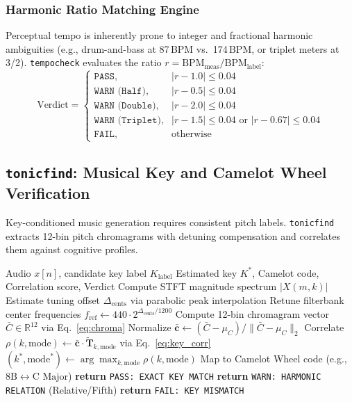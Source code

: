 \documentclass[10pt,journal,compsoc]{IEEEtran}
\begin{document}
\subsubsection{Harmonic Ratio Matching Engine}
Perceptual tempo is inherently prone to integer and fractional harmonic ambiguities (e.g., drum-and-bass at 87\,BPM vs.\ 174\,BPM, or triplet meters at 3/2). \texttt{tempocheck} evaluates the ratio $r = \text{BPM}_{\text{meas}} / \text{BPM}_{\text{label}}$:
\begin{equation}
\text{Verdict} = 
\begin{cases}
\texttt{PASS}, & |r - 1.0| \le 0.04 \\
\texttt{WARN (Half)}, & |r - 0.5| \le 0.04 \\
\texttt{WARN (Double)}, & |r - 2.0| \le 0.04 \\
\texttt{WARN (Triplet)}, & |r - 1.5| \le 0.04 \text{ or } |r - 0.67| \le 0.04 \\
\texttt{FAIL}, & \text{otherwise}
\end{cases}
\label{eq:tempo_verdict}
\end{equation}

\subsection{\texttt{tonicfind}: Musical Key and Camelot Wheel Verification}
Key-conditioned music generation requires consistent pitch labels. \texttt{tonicfind} extracts 12-bin pitch chromagrams with detuning compensation and correlates them against cognitive profiles.

\begin{algorithm}[t]
\caption{\texttt{tonicfind}: Detuning-Corrected Key Identification}
\label{alg:tonicfind}
\begin{algorithmic}[1]
\REQUIRE Audio $x[n]$, candidate key label $K_{\text{label}}$
\ENSURE Estimated key $K^*$, Camelot code, Correlation score, Verdict
\STATE Compute STFT magnitude spectrum $|X(m, k)|$
\STATE Estimate tuning offset $\Delta_{\text{cents}}$ via parabolic peak interpolation
\STATE Retune filterbank center frequencies $f_{\text{ref}} \leftarrow 440 \cdot 2^{\Delta_{\text{cents}}/1200}$
\STATE Compute 12-bin chromagram vector $\bar{C} \in \mathbb{R}^{12}$ via Eq.~\eqref{eq:chroma}
\STATE Normalize $\bar{\mathbf{c}} \leftarrow (\bar{C} - \mu_C) / \|\bar{C} - \mu_C\|_2$
    \STATE Correlate $\rho(k, \text{mode}) \leftarrow \bar{\mathbf{c}} \cdot \tilde{\mathbf{T}}_{k, \text{mode}}$ via Eq.~\eqref{eq:key_corr}
\ENDFOR
\STATE $(k^*, \text{mode}^*) \leftarrow \arg\max_{k, \text{mode}} \rho(k, \text{mode})$
\STATE Map to Camelot Wheel code (e.g., $8\text{B} \leftrightarrow \text{C Major}$)
    \STATE \textbf{return} \texttt{PASS: EXACT KEY MATCH}
    \STATE \textbf{return} \texttt{WARN: HARMONIC RELATION} (Relative/Fifth)
\ELSE
    \STATE \textbf{return} \texttt{FAIL: KEY MISMATCH}
\ENDIF
\end{algorithmic}
\end{algorithm}
\end{document}
